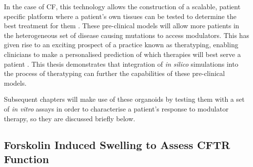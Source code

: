 In the case of CF, this technology allows the construction of a scalable, patient specific platform where a patient's own tissues can be tested to determine the best treatment for them \cite{keegan2021, sato2011}. These pre-clinical models will allow more patients in the heterogeneous set of disease causing mutations to access modulators. This has given rise to an exciting prospect of a practice known as theratyping, enabling clinicians to make a personalised prediction of which therapies will best serve a patient \cite{clancy2019, wong2022, wong2022a, ciciriello2022}. This thesis demonstrates that integration of \textit{in silico} simulations into the process of theratyping can further the capabilities of these pre-clinical models.

Subsequent chapters will make use of these organoids by testing them with a set of \textit{in vitro} assays in order to characterise a patient's response to modulator therapy, so they are discussed briefly below.

\subsection{Forskolin Induced Swelling to Assess CFTR Function}

